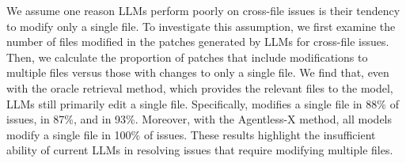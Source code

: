 We assume one reason LLMs perform poorly on cross-file issues is their tendency to modify only a single file. To investigate this assumption, we first examine the number of files modified in the patches generated by LLMs for cross-file issues. Then, we calculate the proportion of patches that include modifications to multiple files versus those with changes to only a single file. We find that, even with the oracle retrieval method, which provides the relevant files to the model, LLMs still primarily edit a single file. Specifically, \Claude modifies a single file in 88\% of issues, \GPT in 87\%, and \DeepSeek in 93\%. Moreover, with the Agentless-X method, all models modify a single file in 100\% of issues. These results highlight the insufficient ability of current LLMs in resolving issues that require modifying multiple files.




